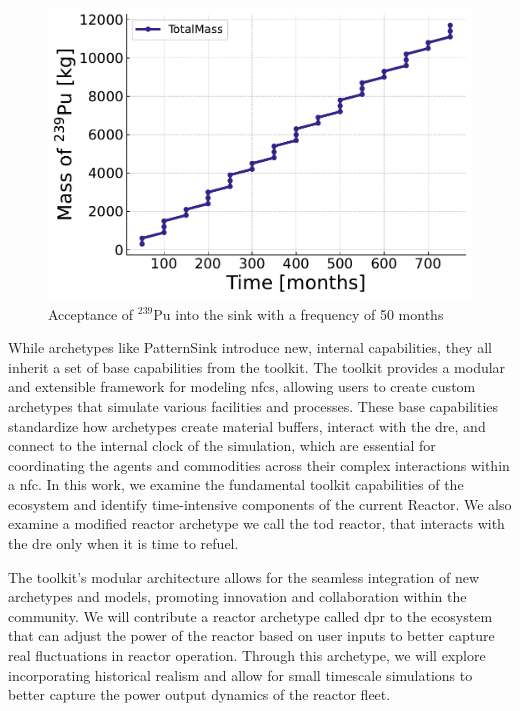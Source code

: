 \begin{figure}[H]
    \centering
    \includegraphics[scale=0.7]{images/cyclus/pattern_sink_fuel_transactions.pdf}
    \caption{Acceptance of $^{239}$Pu into the sink with a frequency of 50 months}
    \label{fig:pattern_freq_50}
\end{figure}

While archetypes like PatternSink introduce new, internal capabilities, they
all inherit a set of base capabilities from the \cyclus toolkit. The \cyclus
toolkit provides a modular and extensible framework for modeling \glspl{nfc},
allowing users to create custom archetypes that simulate various facilities and
processes. These base capabilities standardize how archetypes create material
buffers, interact with the \gls{dre}, and connect to the internal clock of the
simulation, which are essential for coordinating the agents and commodities
across their complex interactions within a \gls{nfc}. In this work, we examine
the fundamental toolkit capabilities of the \cyclus ecosystem and identify
time-intensive components of the current \cycamore Reactor. We also examine a
modified reactor archetype we call the \gls{tod} reactor, that interacts with
the \gls{dre} only when it is time to refuel.

The toolkit's modular architecture allows for the seamless integration of new
archetypes and models, promoting innovation and collaboration within the
\cyclus community. We will contribute a reactor archetype called \gls{dpr} to
the ecosystem that can adjust the power of the reactor based on user inputs to
better capture real fluctuations in reactor operation. Through this archetype,
we will explore incorporating historical realism and allow for small timescale
simulations to better capture the power output dynamics of the reactor fleet.

